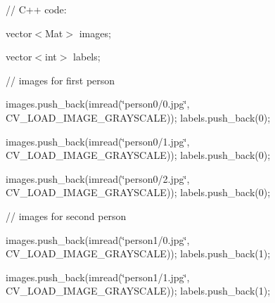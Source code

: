 {\ttfamily }

{\ttfamily }

{\ttfamily // C++ code\+:}

{\ttfamily }

{\ttfamily }

{\ttfamily vector$<$\+Mat$>$ images;}

{\ttfamily }

{\ttfamily }

{\ttfamily vector$<$int$>$ labels;}

{\ttfamily }

{\ttfamily }

{\ttfamily // images for first person}

{\ttfamily }

{\ttfamily }

{\ttfamily images.\+push\+\_\+back(imread(\char`\"{}person0/0.\+jpg\char`\"{}, C\+V\+\_\+\+L\+O\+A\+D\+\_\+\+I\+M\+A\+G\+E\+\_\+\+G\+R\+A\+Y\+S\+C\+A\+LE)); labels.\+push\+\_\+back(0);}

{\ttfamily }

{\ttfamily }

{\ttfamily images.\+push\+\_\+back(imread(\char`\"{}person0/1.\+jpg\char`\"{}, C\+V\+\_\+\+L\+O\+A\+D\+\_\+\+I\+M\+A\+G\+E\+\_\+\+G\+R\+A\+Y\+S\+C\+A\+LE)); labels.\+push\+\_\+back(0);}

{\ttfamily }

{\ttfamily }

{\ttfamily images.\+push\+\_\+back(imread(\char`\"{}person0/2.\+jpg\char`\"{}, C\+V\+\_\+\+L\+O\+A\+D\+\_\+\+I\+M\+A\+G\+E\+\_\+\+G\+R\+A\+Y\+S\+C\+A\+LE)); labels.\+push\+\_\+back(0);}

{\ttfamily }

{\ttfamily }

{\ttfamily // images for second person}

{\ttfamily }

{\ttfamily }

{\ttfamily images.\+push\+\_\+back(imread(\char`\"{}person1/0.\+jpg\char`\"{}, C\+V\+\_\+\+L\+O\+A\+D\+\_\+\+I\+M\+A\+G\+E\+\_\+\+G\+R\+A\+Y\+S\+C\+A\+LE)); labels.\+push\+\_\+back(1);}

{\ttfamily }

{\ttfamily }

{\ttfamily images.\+push\+\_\+back(imread(\char`\"{}person1/1.\+jpg\char`\"{}, C\+V\+\_\+\+L\+O\+A\+D\+\_\+\+I\+M\+A\+G\+E\+\_\+\+G\+R\+A\+Y\+S\+C\+A\+LE)); labels.\+push\+\_\+back(1);}

